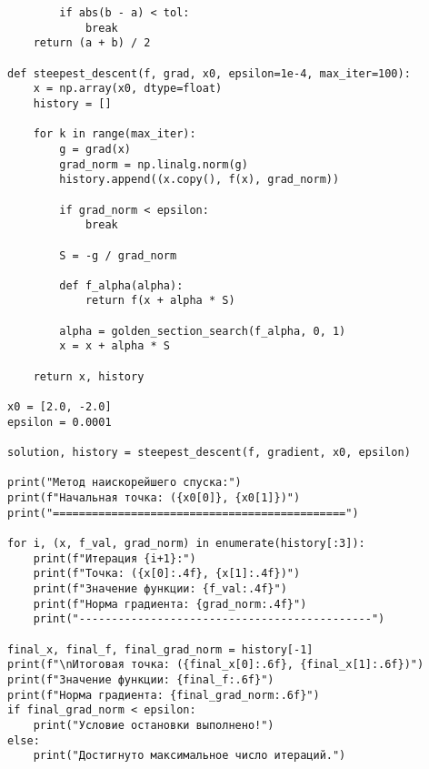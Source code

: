 \documentclass{article}
\begin{document}
\begin{lstlisting}
        if abs(b - a) < tol:
            break
    return (a + b) / 2

def steepest_descent(f, grad, x0, epsilon=1e-4, max_iter=100):
    x = np.array(x0, dtype=float)
    history = []

    for k in range(max_iter):
        g = grad(x)
        grad_norm = np.linalg.norm(g)
        history.append((x.copy(), f(x), grad_norm))

        if grad_norm < epsilon:
            break

        S = -g / grad_norm

        def f_alpha(alpha):
            return f(x + alpha * S)

        alpha = golden_section_search(f_alpha, 0, 1)
        x = x + alpha * S

    return x, history

x0 = [2.0, -2.0]
epsilon = 0.0001

solution, history = steepest_descent(f, gradient, x0, epsilon)

print("Метод наискорейшего спуска:")
print(f"Начальная точка: ({x0[0]}, {x0[1]})")
print("=============================================")

for i, (x, f_val, grad_norm) in enumerate(history[:3]):
    print(f"Итерация {i+1}:")
    print(f"Точка: ({x[0]:.4f}, {x[1]:.4f})")
    print(f"Значение функции: {f_val:.4f}")
    print(f"Норма градиента: {grad_norm:.4f}")
    print("---------------------------------------------")

final_x, final_f, final_grad_norm = history[-1]
print(f"\nИтоговая точка: ({final_x[0]:.6f}, {final_x[1]:.6f})")
print(f"Значение функции: {final_f:.6f}")
print(f"Норма градиента: {final_grad_norm:.6f}")
if final_grad_norm < epsilon:
    print("Условие остановки выполнено!")
else:
    print("Достигнуто максимальное число итераций.")
\end{lstlisting}
\end{document}
